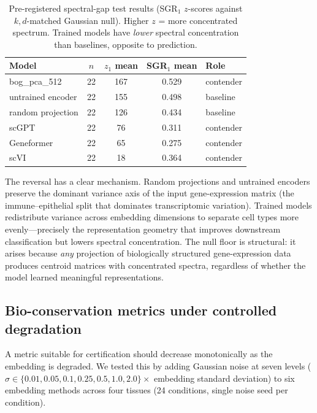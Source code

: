 \documentclass[11pt]{article}
\begin{document}
\begin{table}[t]
\centering
\caption{Pre-registered spectral-gap test results (SGR$_1$ $z$-scores
against $k,d$-matched Gaussian null). Higher $z$ = more concentrated
spectrum. Trained models have \emph{lower} spectral concentration than
baselines, opposite to prediction.}
\label{tab:sgr}
\small
\begin{tabular}{@{}lcccl@{}}
\toprule
Model & $n$ & $z_1$ mean & SGR$_1$ mean & Role \\
\midrule
bog\_pca\_512           & 22 & 167 & 0.529 & contender \\
untrained encoder       & 22 & 155 & 0.498 & baseline \\
random projection       & 22 & 126 & 0.434 & baseline \\
scGPT                   & 22 & 76  & 0.311 & contender \\
Geneformer              & 22 & 65  & 0.275 & contender \\
scVI                    & 22 & 18  & 0.364 & contender \\
\bottomrule
\end{tabular}
\end{table}

The reversal has a clear mechanism. Random projections and untrained
encoders preserve the dominant variance axis of the input gene-expression
matrix (the immune--epithelial split that dominates transcriptomic
variation). Trained models redistribute variance across embedding
dimensions to separate cell types more evenly---precisely the
representation geometry that improves downstream classification but
lowers spectral concentration. The null floor is structural: it
arises because \emph{any} projection of biologically structured
gene-expression data produces centroid matrices with concentrated
spectra, regardless of whether the model learned meaningful
representations.


\subsection{Bio-conservation metrics under controlled degradation}
\label{sec:noise}

A metric suitable for certification should decrease monotonically as the
embedding is degraded. We tested this by adding Gaussian noise at seven
levels ($\sigma \in \{0.01, 0.05, 0.1, 0.25, 0.5, 1.0, 2.0\} \times$
embedding standard deviation) to six embedding methods across four
tissues (24 conditions, single noise seed per condition).
\end{document}
